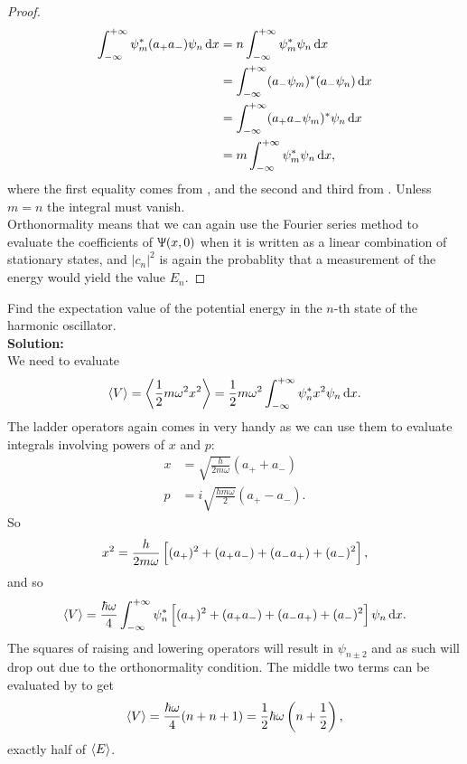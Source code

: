 \begin{proof}
\begin{subequations}
\begin{align}
\intinf\psi_m^*(a_+a_-)\psi_n\dx&=n\intinf\psi_m^*\psi_n\dx\\
&=\intinf(a_-\psi_m)^*(a_-\psi_n)\dx\\
&=\intinf(a_+a_-\psi_m)^*\psi_n\dx\\
&=m\intinf\psi_m^*\psi_n\dx, 
\end{align}
\end{subequations}
where the first equality comes from , and the second and third from . Unless $m=n$ the integral must vanish. \\
Orthonormality means that we can again use the Fourier series method to evaluate the coefficients of $\Uppsi(x,0)$ when it is written as a linear combination of stationary states, and $|c_n|^2$ is again the probablity that a measurement of the energy would yield the value $E_n$. 
\end{proof}
\begin{wex}
\label{wex_ladder_trick}
Find the expectation value of the potential energy in the $n$-th state of the harmonic oscillator.\\
\textbf{Solution: }\\
We need to evaluate 
\begin{equation}
\left< V\right>=\lf< \frac{1}{2}m\omega^2x^2\rt>=\frac{1}{2}m\omega^2\intinf\psi_n^*x^2\psi_n\dx.
\end{equation}
The ladder operators again comes in very handy as we can use them to evaluate integrals involving powers of $x$ and $p$:
\begin{subequations}
\begin{align}
x&=\sqrt{\frac{h}{2m\omega}}(a_++a_-) \label{eq_ladder_trick_x}\\
p&=i\sqrt{\frac{hm\omega}{2}}(a_+-a_-). \label{eq_ladder_trick_p}
\end{align}
\end{subequations}
So 
\begin{equation}
x^2=\frac{h}{2m\omega}\left[(a_+)^2+(a_+a_-)+(a_-a_+)+(a_-)^2 \right],
\end{equation}
and so
\begin{equation}
\lf<V\rt>=\frac{\hbar\omega}{4}\intinf\psi_n^*\lf[(a_+)^2+(a_+a_-)+(a_-a_+)+(a_-)^2 \rt]\psi_n\dx.
\end{equation}
The squares of raising and lowering operators will result in $\psi_{n\pm2}$ and as such will drop out due to the orthonormality condition. The middle two terms can be evaluated by  to get 
\begin{equation}
\label{harm_v_exp}
\left<V\right>=\frac{\hbar\omega}{4}(n+n+1)=\frac{1}{2}\hbar\omega\left(n+\frac{1}{2}\right), 
\end{equation}
exactly half of $\left<E\right>$.
\end{wex}
